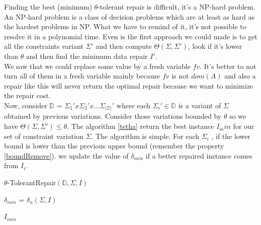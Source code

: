 \documentclass[letterpaper, 12pt]{report}
\begin{document}
Finding the best (minimum) $\theta$-tolerant repair is difficult, it's a NP-hard problem. An NP-hard problem is a class of decision problems which are at least as hard as the hardest problems in NP. What we have to remind of it, it's not possible to resolve it in a polynomial time. Even is the first approach we could made is to get all the constraints variant $\Sigma'$ and then compute $\Theta(\Sigma,\Sigma')$, look if it's lower than $\theta$ and then find the minimum data repair $I'$.\\

We saw that we could replace some value by a fresh variable $fv$. It's better to not turn all of them in a fresh variable mainly because $fv$ is not $dom(A)$ and also a repair like this will never return the optimal repair because we want to minimize the repair cost. \\

Now, consider $\mathbb{D}$ = $\Sigma_1 ' x \Sigma_2' x ... \Sigma_{|\Sigma|}'$ where each $\Sigma_i' \in \mathbb{D}$ is a variant of $\Sigma$ obtained by previous variations. Consider those variations bounded by $\theta$ so we have $\Theta(\Sigma,\Sigma') \leq \theta$. The algorithm \ref{tetha} return the best instance $I_min$ for our set of constraint variation $\Sigma$. The algorithm is simple. For each $\Sigma_i$ , if the lower bound is lower than the previous upper bound (remember the property \ref{boundRemove}). we update the value of $\delta_{min}$ if a better repaired instance comes from $I_i$. \\

\IncMargin{1em}
\begin{algorithm}
\label{tetha}

	\DontPrintSemicolon
  \caption{$\theta$-TolerantRepair$(\mathbb{D},\Sigma,I)$}
  \LinesNumbered

    $\delta_{min}$ = $\delta_u(\Sigma,I)$\;

	\Return $I_{min}$

\end{algorithm}\DecMargin{1em}
\end{document}
